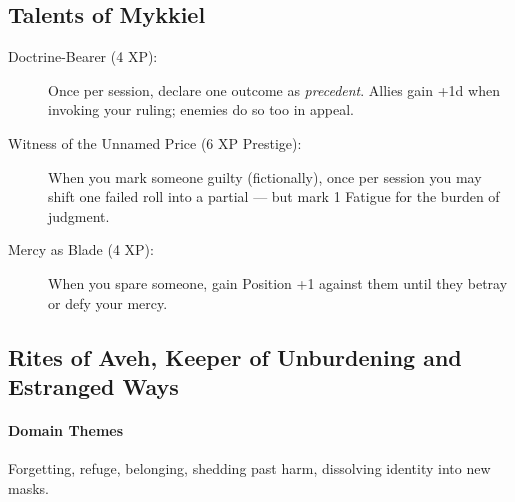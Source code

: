 \documentclass[11pt]{article}
\begin{document}
\subsection{Talents of Mykkiel}

\begin{description}
  \item[Doctrine-Bearer (4 XP):]
  Once per session, declare one outcome as \emph{precedent}. Allies gain
  +1d when invoking your ruling; enemies do so too in appeal.

  \item[Witness of the Unnamed Price (6 XP Prestige):]
  When you mark someone guilty (fictionally), once per session you may
  shift one failed roll into a partial --- but mark 1 Fatigue for the
  burden of judgment.

  \item[Mercy as Blade (4 XP):]
  When you spare someone, gain Position +1 against them until they
  betray or defy your mercy.
\end{description}

\vspace{5mm}

\subsection{Rites of Aveh, Keeper of Unburdening and Estranged Ways}

\paragraph{Domain Themes}
Forgetting, refuge, belonging, shedding past harm, dissolving identity
into new masks.
\end{document}
